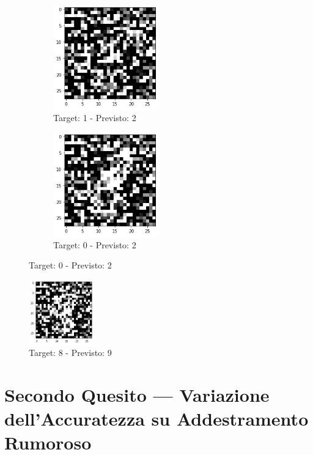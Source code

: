 \documentclass[12pt, a4paper]{article}
\begin{document}
\begin{figure}[H]
    \begin{subfigure}{0.5\textwidth}
        \centering
        \caption{Target: 1 - Previsto: 2}
        \includegraphics[width=0.5\textwidth]{ErrConv3.png}
    \end{subfigure}
    \begin{subfigure}{0.5\textwidth}
        \centering
        \caption{Target: 0 - Previsto: 2}
        \includegraphics[width=0.5\textwidth]{ErrConv4.png}
    \end{subfigure}
\end{figure}

\begin{figure}[H]
    \centering
    \caption{Target: 8 - Previsto: 9}
    \includegraphics[width=0.25\textwidth]{ErrConv5.png}
\end{figure}

\newpage
\section{Secondo Quesito --- Variazione dell'Accuratezza su Addestramento Rumoroso}
\end{document}
